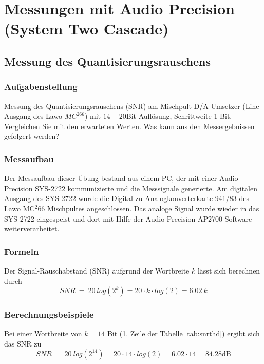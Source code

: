 \section{Messungen mit Audio Precision (System Two Cascade)}
\subsection{Messung des Quantisierungsrauschens}
\subsubsection{Aufgabenstellung}
Messung des Quantisierungsrauschens (SNR) am Mischpult D/A Umsetzer (Line Ausgang des Lawo $MC^266$) mit $14-20$Bit Auflösung, Schrittweite 1 Bit. Vergleichen Sie mit den erwarteten Werten. Was kann aus den Messergebnissen gefolgert werden?

\subsubsection{Messaufbau}
Der Messaufbau dieser Übung bestand aus einem PC, der mit einer Audio Precision SYS-2722 kommunizierte und die Messsignale generierte. Am digitalen Ausgang des SYS-2722 wurde die Digital-zu-Analogkonverterkarte 941/83 des Lawo MC$^2$66 Mischpultes angeschlossen. Das analoge Signal wurde wieder in das SYS-2722 eingespeist und dort mit Hilfe der Audio Precision AP2700 Software weiterverarbeitet.
\subsubsection{Formeln}
Der Signal-Rauschabstand (SNR) aufgrund der Wortbreite $k$ lässt sich berechnen durch 
\begin{equation}
\label{form:SNR2}
SNR \ = \ 20 \ log \left(2^k\right) = 20 \cdot k \cdot log \left( 2 \right) = 6.02 \ k
\end{equation}
\subsubsection{Berechnungsbeispiele}
Bei einer Wortbreite von $k=14$ Bit (1. Zeile der Tabelle \ref{tab:snrthd}) ergibt sich das SNR zu
\begin{equation}
\label{eg:SNR8bit2}
SNR \ = \ 20 \ log \left(2^{14}\right) = 20 \cdot 14 \cdot log \left( 2 \right) = 6.02 \cdot 14 = 84.28 \text{dB}
\end{equation}
